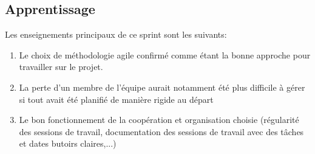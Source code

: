 \subsection{Apprentissage}

Les enseignements principaux de ce sprint sont les suivants:

\begin{enumerate}
    \item Le choix de méthodologie agile confirmé comme étant la bonne approche pour travailler sur le projet.
    \item La perte d’un membre de l'équipe aurait notamment été plus difficile à gérer si tout avait été planifié 
    de manière rigide au départ
    \item Le bon fonctionnement de la coopération et organisation choisie (régularité des sessions de travail, documentation des sessions
    de travail avec des tâches et dates butoirs claires,...)
\end{enumerate}